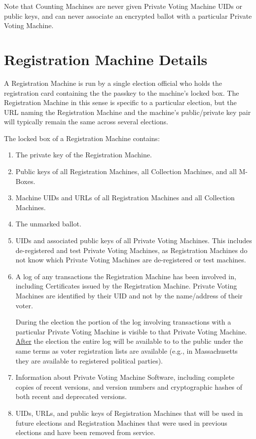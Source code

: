 \documentclass[12pt]{article}
\begin{document}
Note that Counting Machines are never given Private Voting
Machine UIDs or public keys, and can never associate an
encrypted ballot with a particular Private Voting Machine.

\section{Registration Machine Details}

A Registration Machine is run by a single election official
who holds the registration card containing the the passkey to
the machine's locked box.  The Registration Machine in this
sense is specific to a particular election, but the
URL naming the Registration Machine and the machine's
public/private key pair will typically remain the same across
several elections.

The locked box of a Registration Machine contains:
\begin{enumerate}
\item The private key of the Registration Machine.
\item Public keys of all Registration Machines, all Collection
Machines, and all M-Boxes.
\item Machine UIDs and URLs of all Registration Machines and all Collection
Machines.
\item The unmarked ballot.
\item UIDs and associated public keys of all Private Voting
Machines.  This includes de-registered and test Private Voting
Machines, as Registration Machines do not know which Private Voting
Machines are de-registered or test machines.
\item A log of any transactions the Registration Machine has
been involved in, including  Certificates issued by the Registration Machine.
Private Voting Machines are identified by their UID and not by the
name/address of their voter.

During the election the portion of the log involving transactions with
a particular Private Voting Machine is visible to that Private Voting
Machine.  \underline{After} the election the entire log will be available to
to the public under the same terms as voter registration lists are
available (e.g., in Massachusetts they are available to registered
political parties).
\item Information about Private Voting Machine Software, including
complete copies of recent versions, and version numbers and
cryptographic hashes of both recent and deprecated versions.
\item UIDs, URLs, and public keys of Registration Machines that will be used
in future elections and Registration Machines that were used in previous
elections and have been removed from service.
\end{enumerate}
\end{document}
